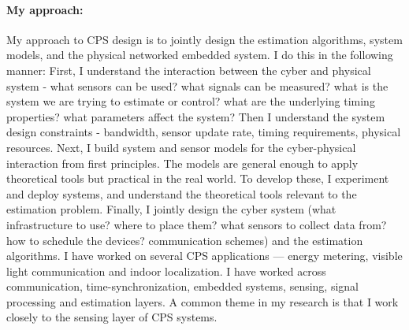 \documentclass[10pt]{article}
\begin{document}

\paragraph{My approach:}
My approach to CPS design is to jointly design the estimation
algorithms, system models, and the physical networked embedded
system. I do this in the following manner: First, I understand the
interaction between the cyber and physical system - what sensors can
be used? what signals can be measured? what is the system we are
trying to estimate or control? what are the underlying timing
properties? what parameters affect the system? Then I understand the
system design constraints - bandwidth, sensor update rate, timing
requirements, physical resources. Next, I build system and sensor
models for the cyber-physical interaction from first principles. The
models are general enough to apply theoretical tools but practical in
the real world. To develop these, I experiment and deploy systems, and
understand the theoretical tools relevant to the estimation
problem. Finally, I jointly design the cyber system (what
infrastructure to use? where to place them? what sensors to collect
data from? how to schedule the devices? communication schemes) and the
estimation algorithms.
I have worked on several CPS applications --- energy metering, visible
light communication and indoor localization. I have worked across
communication, time-synchronization, embedded systems, sensing, signal
processing and estimation layers. A common theme in my research is
that I work closely to the sensing layer of CPS systems.



\end{document}
